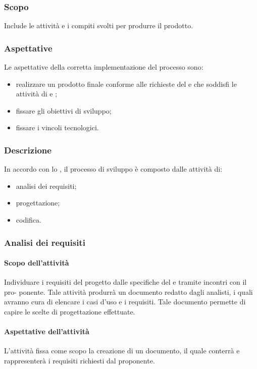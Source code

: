 \subsubsection{Scopo}
Include le attività e i compiti svolti per produrre il prodotto.
\subsubsection{Aspettative}
Le aspettative della corretta implementazione del processo sono:
\begin{itemize}
		\item realizzare un prodotto finale conforme alle richieste del  e che soddisfi le attività di  e ;
		\item fissare gli obiettivi di sviluppo;
		\item fissare i vincoli tecnologici.
\end{itemize}

\subsubsection{Descrizione}
In accordo con lo  , il processo di sviluppo è composto dalle attività di:
\begin{itemize}
		\item analisi dei requisiti;
		\item progettazione;
		\item codifica.
\end{itemize}

\subsubsection{Analisi dei requisiti}
 \paragraph{Scopo dell'attività}
  Individuare i requisiti del progetto dalle specifiche del  e tramite incontri con il pro-
  ponente. Tale attività produrrà un documento redatto dagli analisti, i quali avranno cura di elencare i casi d'uso e i requisiti. Tale documento permette di
 capire le scelte di progettazione effettuate.
 \paragraph{Aspettative dell'attività}
 L'attività fissa come scopo la creazione di un documento, il quale conterrà e rappresenterà i requisiti richiesti dal proponente.
